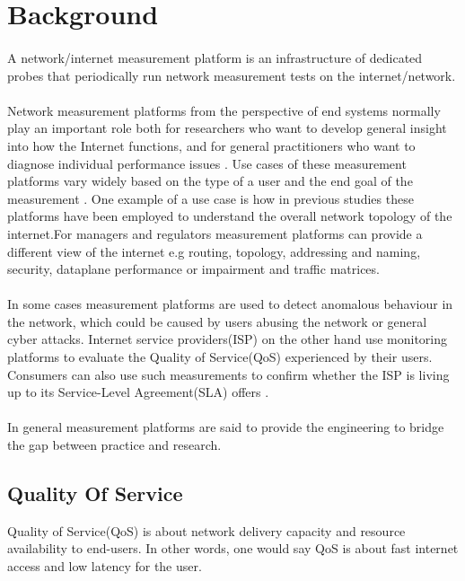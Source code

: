 \section{Background}
\paragraph{}
A network/internet measurement platform is an infrastructure of dedicated probes that periodically run network measurement tests on the internet/network\cite{7076582}.

\paragraph{}
 Network measurement platforms from the perspective of end systems normally play an important role both for researchers who want to develop general insight into how the Internet functions, and for general practitioners who want to diagnose individual performance issues \cite{Dhawan:2012:FBN:2398776.2398786}. Use cases of these measurement platforms vary widely based on the type of a user and the end goal of the measurement \cite{Ford:2018:RWR:3243157.3243167}. One example of a use case is how in  previous studies these platforms have been employed to understand the overall network topology of the internet\cite{7076582}.For managers and regulators measurement platforms can provide a different view of the internet e.g routing, topology, addressing and naming, security, dataplane performance or impairment and traffic matrices\cite{Ford:2018:RWR:3243157.3243167}.
\paragraph{}
In some cases measurement platforms are used to detect anomalous behaviour in the network, which could be caused by users abusing the network or general cyber attacks. Internet service providers(ISP) on the other hand use monitoring platforms to evaluate the Quality of Service(QoS) experienced by their users\cite{7076582}. Consumers can also use such measurements to confirm whether the ISP is living up to its Service-Level Agreement(SLA) offers \cite{7076582}.
\paragraph{}
In general measurement platforms are said to provide the engineering to bridge the gap between practice and research\cite{Ford:2018:RWR:3243157.3243167}.
\subsection{Quality Of Service}
Quality of Service(QoS) is about network delivery capacity and resource availability to end-users\cite{5430142}. In other words, one would say QoS is about fast internet access and low latency for the user.
